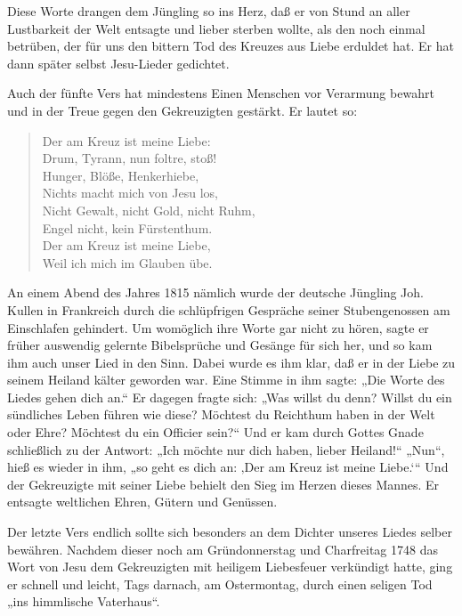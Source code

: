 
Diese Worte drangen dem Jüngling so ins Herz, daß er von Stund an aller Lustbarkeit der Welt entsagte und lieber sterben wollte, als den noch einmal betrüben, der für uns den bittern Tod des Kreuzes aus Liebe erduldet hat. Er hat dann später selbst Jesu-Lieder gedichtet.

Auch der fünfte Vers hat mindestens Einen Menschen vor Verarmung bewahrt und in der Treue gegen den Gekreuzigten gestärkt. Er lautet so:

\begin{verse}
Der am Kreuz ist meine Liebe:\\
Drum, Tyrann, nun foltre, stoß!\\
Hunger, Blöße, Henkerhiebe,\\
Nichts macht mich von Jesu los,\\
Nicht Gewalt, nicht Gold, nicht Ruhm,\\
Engel nicht, kein Fürstenthum.\\
Der am Kreuz ist meine Liebe,\\
Weil ich mich im Glauben übe.
\end{verse}

An einem Abend des Jahres 1815 nämlich wurde der deutsche Jüngling Joh. Kullen in Frankreich durch die schlüpfrigen Gespräche seiner Stubengenossen am Einschlafen gehindert. Um womöglich ihre Worte gar nicht zu hören, sagte er früher auswendig gelernte Bibelsprüche und Gesänge für sich her, und so kam ihm auch unser Lied in den Sinn. Dabei wurde es ihm klar, daß er in der Liebe zu seinem Heiland kälter geworden war. Eine Stimme in ihm sagte: „Die Worte des Liedes gehen dich an.“ Er dagegen fragte sich: „Was willst du denn? Willst du ein sündliches Leben führen wie diese? Möchtest du Reichthum haben in der Welt oder Ehre? Möchtest du ein Officier sein?“ Und er kam durch Gottes Gnade schließlich zu der Antwort: „Ich möchte nur dich haben, lieber Heiland!“ „Nun“, hieß es wieder in ihm, „so geht es dich an: ‚Der am Kreuz ist meine Liebe.‘“ Und der Gekreuzigte mit seiner Liebe behielt den Sieg im Herzen dieses Mannes. Er entsagte weltlichen Ehren, Gütern und Genüssen.

Der letzte Vers endlich sollte sich besonders an dem Dichter unseres Liedes selber bewähren. Nachdem dieser noch am Gründonnerstag und Charfreitag 1748 das Wort von Jesu dem Gekreuzigten mit heiligem Liebesfeuer verkündigt hatte, ging er schnell und leicht, Tags darnach, am Ostermontag, durch einen seligen Tod „ins himmlische Vaterhaus“.

